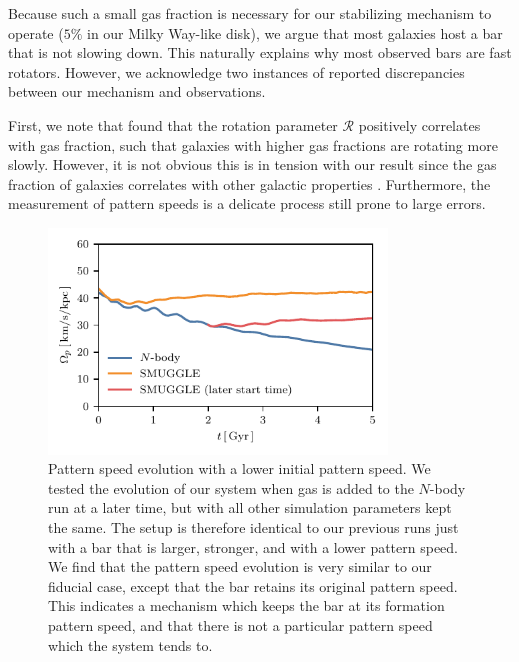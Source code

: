\documentclass[fleqn,usenatbib]{mnras}
\newcommand{\Rot}{\ensuremath{\mathcal{R}}}
\newcommand{\Nbody}{$N$-body}
\begin{document}
Because such a small gas fraction is necessary for our stabilizing mechanism to
operate ($5\%$ in our Milky Way-like disk), we argue that most galaxies host a
bar that is not slowing down. This naturally explains why most observed bars are
fast rotators. However, we acknowledge two instances of reported discrepancies
between our mechanism and observations.

First, we note that \citet{2020MNRAS.491.3655G} found that the rotation
parameter \Rot{} positively correlates with gas fraction, such that galaxies
with higher gas fractions are rotating more slowly. However, it is not obvious
this is in tension with our result since the gas fraction of galaxies correlates
with other galactic properties \citep{2009ARAA..47..159B}. Furthermore, the
measurement of pattern speeds is a delicate process still prone to large errors.
\begin{figure}
    \centering
    \includegraphics[width=9cm]{fig/ps_late_start.pdf}
    \caption{Pattern speed evolution with a lower initial pattern speed. We
    tested the evolution of our system when gas is added to the \Nbody{} run at
    a later time, but with all other simulation parameters kept the same. The
    setup is therefore identical to our previous runs just with a bar that is
    larger, stronger, and with a lower pattern speed. We find that the pattern
    speed evolution is very similar to our fiducial case, except that the bar
    retains its original pattern speed. This indicates a mechanism which keeps
    the bar at its formation pattern speed, and that there is not a particular
    pattern speed which the system tends to.}
    \label{fig:snap700}
\end{figure}
\end{document}
